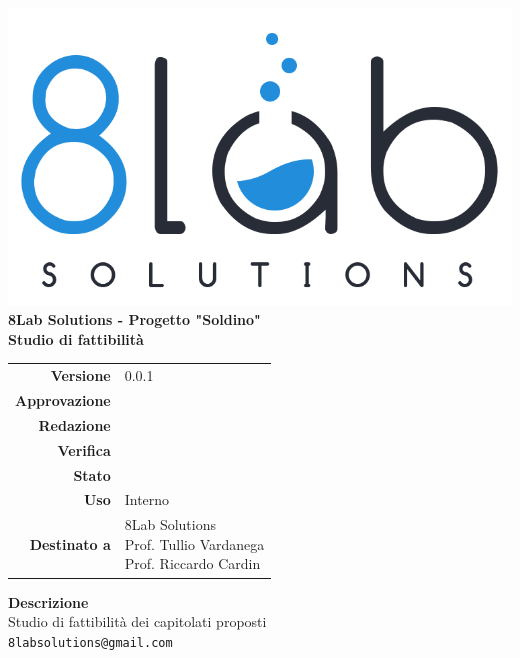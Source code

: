 \thispagestyle{empty}
\begin{titlepage}
	\begin{center}
		\includegraphics[scale = 0.3]{images/logo8_crop.png}\\
		\large \textbf{8Lab Solutions - Progetto "Soldino"} \\
		\vfill
		\Huge \textbf{Studio di fattibilità}
		\vspace*{\fill}
        
        \vfill
        \large
        \begin{tabular}{r|l}
                        \textbf{Versione} & 0.0.1\\
                        \textbf{Approvazione} &\\
                        \textbf{Redazione} &\\
                        \textbf{Verifica} &\\
                        \textbf{Stato} &\\
                        \textbf{Uso} & Interno\\
                        \textbf{Destinato a} & \parbox[t]{5cm}{8Lab Solutions
                        \\Prof. Tullio Vardanega\\Prof. Riccardo Cardin}
                \end{tabular}
                \vfill
                \normalsize
                \textbf{Descrizione}\\
                Studio di fattibilità dei capitolati proposti\\
                \vfill
                \small
                \texttt{8labsolutions@gmail.com}
	\end{center}
\end{titlepage}